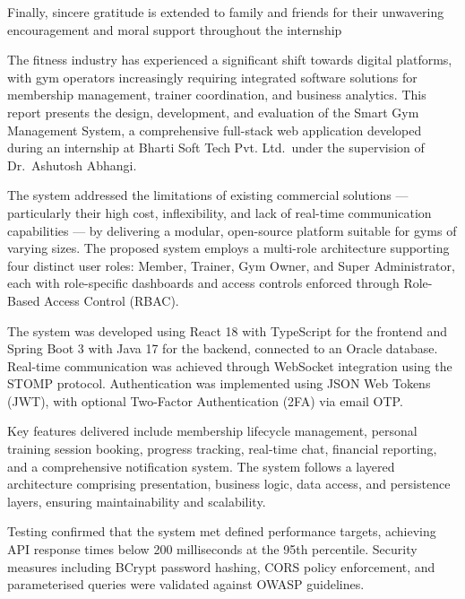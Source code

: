 \documentclass[
  12pt,
  a4paperpaper,
]{report}
\begin{document}
\medskip

Finally, sincere gratitude is extended to family and friends for their
unwavering encouragement and moral support throughout the internship
\vspace*{\fill}
\clearpage
\vspace*{\fill}

\label{abstract}
\vspace{12pt}


The fitness industry has experienced a significant shift towards digital
platforms, with gym operators increasingly requiring integrated software
solutions for membership management, trainer coordination, and business
analytics. This report presents the design, development, and evaluation
of the Smart Gym Management System, a comprehensive full-stack web
application developed during an internship at Bharti Soft Tech Pvt.
Ltd.~under the supervision of Dr.~Ashutosh Abhangi.

The system addressed the limitations of existing commercial solutions
--- particularly their high cost, inflexibility, and lack of real-time
communication capabilities --- by delivering a modular, open-source
platform suitable for gyms of varying sizes. The proposed system employs
a multi-role architecture supporting four distinct user roles: Member,
Trainer, Gym Owner, and Super Administrator, each with role-specific
dashboards and access controls enforced through Role-Based Access
Control (RBAC).

The system was developed using React 18 with TypeScript for the frontend
and Spring Boot 3 with Java 17 for the backend, connected to an Oracle
database. Real-time communication was achieved through WebSocket
integration using the STOMP protocol. Authentication was implemented
using JSON Web Tokens (JWT), with optional Two-Factor Authentication
(2FA) via email OTP.

Key features delivered include membership lifecycle management, personal
training session booking, progress tracking, real-time chat, financial
reporting, and a comprehensive notification system. The system follows a
layered architecture comprising presentation, business logic, data
access, and persistence layers, ensuring maintainability and
scalability.

Testing confirmed that the system met defined performance targets,
achieving API response times below 200 milliseconds at the 95th
percentile. Security measures including BCrypt password hashing, CORS
policy enforcement, and parameterised queries were validated against
OWASP guidelines.
\end{document}
